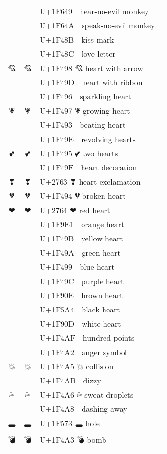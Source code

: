 \documentclass[a4paper,12pt]{ltjarticle}
\newcommand{\fontA}[1]{{\fontspec[RawFeature={mode=harf,+dist,+ccmp}]{Segoe UI Emoji} #1}}
\newcommand{\fontB}[1]{{\fontspec[RawFeature={mode=harf,+dist,+ccmp}]{Noto Color Emoji} #1}}
\begin{document}
\begin{longtable}[c]{ccp{0.8\linewidth}}
\fontA{🙉}&\fontB{🙉}&U+1F649 🙉 hear-no-evil monkey\\
\fontA{🙊}&\fontB{🙊}&U+1F64A 🙊 speak-no-evil monkey\\
\fontA{💋}&\fontB{💋}&U+1F48B 💋 kiss mark\\
\fontA{💌}&\fontB{💌}&U+1F48C 💌 love letter\\
\fontA{💘}&\fontB{💘}&U+1F498 💘 heart with arrow\\
\fontA{💝}&\fontB{💝}&U+1F49D 💝 heart with ribbon\\
\fontA{💖}&\fontB{💖}&U+1F496 💖 sparkling heart\\
\fontA{💗}&\fontB{💗}&U+1F497 💗 growing heart\\
\fontA{💓}&\fontB{💓}&U+1F493 💓 beating heart\\
\fontA{💞}&\fontB{💞}&U+1F49E 💞 revolving hearts\\
\fontA{💕}&\fontB{💕}&U+1F495 💕 two hearts\\
\fontA{💟}&\fontB{💟}&U+1F49F 💟 heart decoration\\
\fontA{❣}&\fontB{❣}&U+2763 ❣ heart exclamation\\
\fontA{💔}&\fontB{💔}&U+1F494 💔 broken heart\\
\fontA{❤}&\fontB{❤}&U+2764 ❤ red heart\\
\fontA{🧡}&\fontB{🧡}&U+1F9E1 🧡 orange heart\\
\fontA{💛}&\fontB{💛}&U+1F49B 💛 yellow heart\\
\fontA{💚}&\fontB{💚}&U+1F49A 💚 green heart\\
\fontA{💙}&\fontB{💙}&U+1F499 💙 blue heart\\
\fontA{💜}&\fontB{💜}&U+1F49C 💜 purple heart\\
\fontA{🤎}&\fontB{🤎}&U+1F90E 🤎 brown heart\\
\fontA{🖤}&\fontB{🖤}&U+1F5A4 🖤 black heart\\
\fontA{🤍}&\fontB{🤍}&U+1F90D 🤍 white heart\\
\fontA{💯}&\fontB{💯}&U+1F4AF 💯 hundred points\\
\fontA{💢}&\fontB{💢}&U+1F4A2 💢 anger symbol\\
\fontA{💥}&\fontB{💥}&U+1F4A5 💥 collision\\
\fontA{💫}&\fontB{💫}&U+1F4AB 💫 dizzy\\
\fontA{💦}&\fontB{💦}&U+1F4A6 💦 sweat droplets\\
\fontA{💨}&\fontB{💨}&U+1F4A8 💨 dashing away\\
\fontA{🕳}&\fontB{🕳}&U+1F573 🕳 hole\\
\fontA{💣}&\fontB{💣}&U+1F4A3 💣 bomb\\

\end{longtable}
\end{document}
